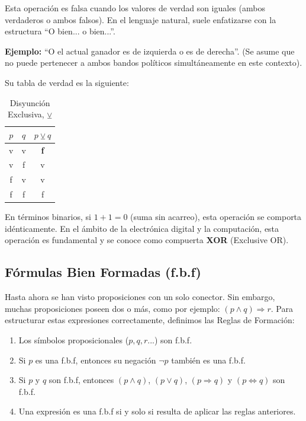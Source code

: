 Esta operación es falsa cuando los valores de verdad son iguales (ambos verdaderos o ambos falsos). En el lenguaje natural, suele enfatizarse con la estructura ``O bien... o bien...''.

\noindent \textbf{Ejemplo:}
``O el actual ganador es de izquierda o es de derecha''.
(Se asume que no puede pertenecer a ambos bandos políticos simultáneamente en este contexto).

Su tabla de verdad es la siguiente:

\begin{table}[ht]
\caption{Disyunción Exclusiva, $\veebar$}\label{tabla:xor}
\centering
\begin{tabular}{|c|c|c|}
\hline
$p$ & $q$ & $p \veebar q$ \\ \hline
v   & v   & \textbf{f}    \\ \hline
v   & f   & v             \\ \hline
f   & v   & v             \\ \hline
f   & f   & f             \\ \hline
\end{tabular}
\end{table}

En términos binarios, si $1+1=0$ (suma sin acarreo), esta operación se comporta idénticamente. En el ámbito de la electrónica digital y la computación, esta operación es fundamental y se conoce como compuerta \textbf{XOR} (Exclusive OR).

\subsection{Fórmulas Bien Formadas (f.b.f)}

Hasta ahora se han visto proposiciones con un solo conector. Sin embargo, muchas proposiciones poseen dos o más, como por ejemplo: $(p \land q) \Rightarrow r$. Para estructurar estas expresiones correctamente, definimos las Reglas de Formación:

\begin{enumerate}
    \item Los símbolos proposicionales ($p, q, r...$) son f.b.f.
    \item Si $p$ es una f.b.f, entonces su negación $\lnot p$ también es una f.b.f.
    \item Si $p$ y $q$ son f.b.f, entonces $(p \land q)$, $(p \lor q)$, $(p \Rightarrow q)$ y $(p \iff q)$ son f.b.f.
    \item Una expresión es una f.b.f si y solo si resulta de aplicar las reglas anteriores.
\end{enumerate}

